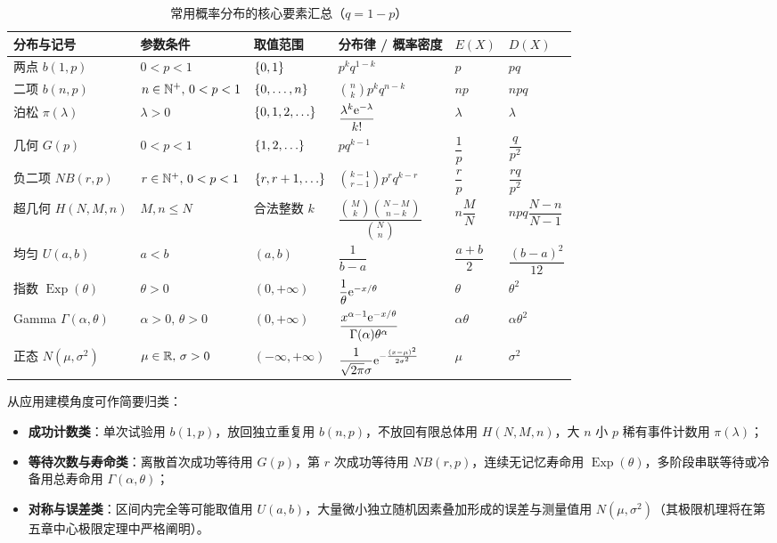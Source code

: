 \begin{table}[htbp]
\centering
\caption{常用概率分布的核心要素汇总（$q=1-p$）}
\label{tab:common-distributions}
\renewcommand{\arraystretch}{1.55}
\small
\begin{tabularx}{\textwidth}{@{}llllll@{}}
\toprule
分布与记号 & 参数条件 & 取值范围 & 分布律 / 概率密度 & $E(X)$ & $D(X)$ \\
\midrule
两点 $b(1,p)$ & $0<p<1$ & $\{0,1\}$ & $p^k q^{1-k}$ & $p$ & $pq$ \\
二项 $b(n,p)$ & $n\in\mathbb{N}^+,\,0<p<1$ & $\{0,\ldots,n\}$ & $\binom{n}{k}p^k q^{n-k}$ & $np$ & $npq$ \\
泊松 $\pi(\lambda)$ & $\lambda>0$ & $\{0,1,2,\ldots\}$ & $\dfrac{\lambda^k\mathrm{e}^{-\lambda}}{k!}$ & $\lambda$ & $\lambda$ \\
几何 $G(p)$ & $0<p<1$ & $\{1,2,\ldots\}$ & $pq^{k-1}$ & $\dfrac{1}{p}$ & $\dfrac{q}{p^2}$ \\
负二项 $NB(r,p)$ & $r\in\mathbb{N}^+,\,0<p<1$ & $\{r,r+1,\ldots\}$ & $\binom{k-1}{r-1}p^r q^{k-r}$ & $\dfrac{r}{p}$ & $\dfrac{rq}{p^2}$ \\
超几何 $H(N,M,n)$ & $M,n\le N$ & 合法整数 $k$ & $\dfrac{\binom{M}{k}\binom{N-M}{n-k}}{\binom{N}{n}}$ & $n\dfrac{M}{N}$ & $npq\dfrac{N-n}{N-1}$ \\
\midrule
均匀 $U(a,b)$ & $a<b$ & $(a,b)$ & $\dfrac{1}{b-a}$ & $\dfrac{a+b}{2}$ & $\dfrac{(b-a)^2}{12}$ \\
指数 $\operatorname{Exp}(\theta)$ & $\theta>0$ & $(0,+\infty)$ & $\dfrac{1}{\theta}\mathrm{e}^{-x/\theta}$ & $\theta$ & $\theta^2$ \\
Gamma $\Gamma(\alpha,\theta)$ & $\alpha>0,\,\theta>0$ & $(0,+\infty)$ & $\dfrac{x^{\alpha-1}\mathrm{e}^{-x/\theta}}{\Gamma(\alpha)\theta^\alpha}$ & $\alpha\theta$ & $\alpha\theta^2$ \\
正态 $N(\mu,\sigma^2)$ & $\mu\in\mathbb{R},\,\sigma>0$ & $(-\infty,+\infty)$ & $\dfrac{1}{\sqrt{2\pi}\sigma}\mathrm{e}^{-\frac{(x-\mu)^2}{2\sigma^2}}$ & $\mu$ & $\sigma^2$ \\
\bottomrule
\end{tabularx}
\end{table}


从应用建模角度可作简要归类：
\begin{itemize}
  \item \textbf{成功计数类}：单次试验用 $b(1,p)$，放回独立重复用 $b(n,p)$，不放回有限总体用 $H(N,M,n)$，大 $n$ 小 $p$ 稀有事件计数用 $\pi(\lambda)$；
  \item \textbf{等待次数与寿命类}：离散首次成功等待用 $G(p)$，第 $r$ 次成功等待用 $NB(r,p)$，连续无记忆寿命用 $\operatorname{Exp}(\theta)$，多阶段串联等待或冷备用总寿命用 $\Gamma(\alpha,\theta)$；
  \item \textbf{对称与误差类}：区间内完全等可能取值用 $U(a,b)$，大量微小独立随机因素叠加形成的误差与测量值用 $N(\mu,\sigma^2)$（其极限机理将在第五章中心极限定理中严格阐明）。
\end{itemize}

